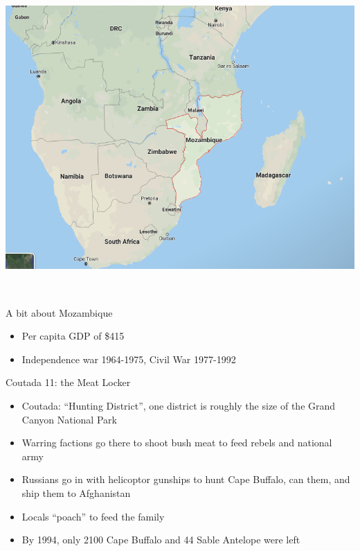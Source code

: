 \begin{frame}{}
\protect\hypertarget{section-28}{}

\includegraphics[width=\textwidth,height=4.6875in]{figures/m4_mozambique.png}

\end{frame}

\begin{frame}{A bit about Mozambique}
\protect\hypertarget{a-bit-about-mozambique}{}

\begin{itemize}
\tightlist
\item
  Per capita GDP of \$415
\item
  Independence war 1964-1975, Civil War 1977-1992
\end{itemize}

\end{frame}

\begin{frame}{Coutada 11: the Meat Locker}
\protect\hypertarget{coutada-11-the-meat-locker}{}

\begin{itemize}
\tightlist
\item
  Coutada: ``Hunting District'', one district is roughly the size of the
  Grand Canyon National Park
\item
  Warring factions go there to shoot bush meat to feed rebels and
  national army
\item
  Russians go in with helicoptor gunships to hunt Cape Buffalo, can
  them, and ship them to Afghanistan
\item
  Locals ``poach'' to feed the family
\item
  By 1994, only 2100 Cape Buffalo and 44 Sable Antelope were left
\end{itemize}

\end{frame}

